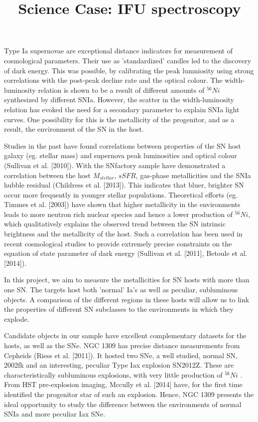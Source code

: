 \documentclass{article}
\begin{document}
\title{Science Case: IFU spectroscopy}
\maketitle
Type Ia supernovae are exceptional distance indicators for measurement of cosmological parameters. Their use as 'standardized' candles led to the discovery of dark energy. This was possible, by calibrating the peak lumniosity using strong correlations with the post-peak decline rate and the optical colour. The width-luminosity relation is shown to be a  result of different amounts of $^{56}Ni$ synthesized by different SNIa. However, the scatter in the width-luminosity relation has evoked the need for a secondary parameter to explain SNIa light curves. One possibility for this is the metallicity of the progenitor, and as a result, the environment of the SN in the host. 

Studies in the past have found correlations between properties of the SN host galaxy (eg. stellar mass) and supernova peak luminosities and optical colour (Sullivan et al. [2010]).  With the SNfactory sample have demonstrated a correlation between the host $M_{stellar}$, $sSFR$, gas-phase metallicities and the SNIa hubble residual (Childress et al. [2013]).
This indicates that bluer, brighter SN occur more frequently in younger stellar populations. Theoretical efforts (eg. Timmes et al. [2003]) have shown that higher metallicity in the environments leads to more neutron rich nuclear species and hence a lower production of 
$^{56}Ni$, which qualitatively explains the observed trend between the SN intrinsic brightness and the metallicity of the host. Such a correlation has been used in recent cosmological studies to provide extremely precise constraints on the equation of state parameter of dark energy (Sullivan et al. [2011], Betoule et al. [2014]). 

In this project, we aim to measure the metallicities for SN hosts with more than one SN. The targets host both 'normal' Ia's as well as peculiar, subluminous objects. A comparison of the different regions in these hosts will allow us to link the properties of different SN subclasses to the environments in which they explode. 

Candidate objects in our sample have excellent complementary datasets for the hosts, as well as the SNe. NGC 1309 has precise distance measurements from Cepheids (Riess et al. [2011]). It hosted two
SNe, a well studied, normal SN, 2002fk and an interesting, peculiar Type Iax explosion SN2012Z.  These are characteristically subluminous explosions, with very little production of $^{56}Ni$ . From HST pre-explosion imaging, Mccully et al. [2014] have, for the first time identified the progenitor star of such an explosion. Hence, NGC 1309 presents the ideal opportunity to study the difference between the environments of normal SNIa and more peculiar Iax SNe. 
\end{document}
